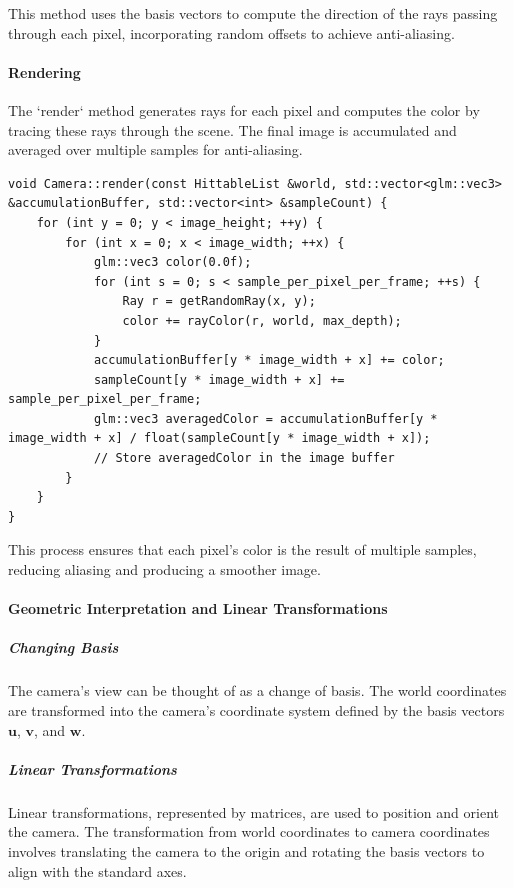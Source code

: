 \documentclass[12pt]{article}
\begin{document}
This method uses the basis vectors to compute the direction of the rays passing through each pixel, incorporating random offsets to achieve anti-aliasing.

\paragraph{Rendering}
The `render` method generates rays for each pixel and computes the color by tracing these rays through the scene. The final image is accumulated and averaged over multiple samples for anti-aliasing.

\begin{verbatim}
void Camera::render(const HittableList &world, std::vector<glm::vec3> &accumulationBuffer, std::vector<int> &sampleCount) {
    for (int y = 0; y < image_height; ++y) {
        for (int x = 0; x < image_width; ++x) {
            glm::vec3 color(0.0f);
            for (int s = 0; s < sample_per_pixel_per_frame; ++s) {
                Ray r = getRandomRay(x, y);
                color += rayColor(r, world, max_depth);
            }
            accumulationBuffer[y * image_width + x] += color;
            sampleCount[y * image_width + x] += sample_per_pixel_per_frame;
            glm::vec3 averagedColor = accumulationBuffer[y * image_width + x] / float(sampleCount[y * image_width + x]);
            // Store averagedColor in the image buffer
        }
    }
}
\end{verbatim}

This process ensures that each pixel's color is the result of multiple samples, reducing aliasing and producing a smoother image.

\paragraph{Geometric Interpretation and Linear Transformations}

\subparagraph{Changing Basis}
The camera's view can be thought of as a change of basis. The world coordinates are transformed into the camera's coordinate system defined by the basis vectors \(\mathbf{u}\), \(\mathbf{v}\), and \(\mathbf{w}\).

\subparagraph{Linear Transformations}
Linear transformations, represented by matrices, are used to position and orient the camera. The transformation from world coordinates to camera coordinates involves translating the camera to the origin and rotating the basis vectors to align with the standard axes.
\end{document}
